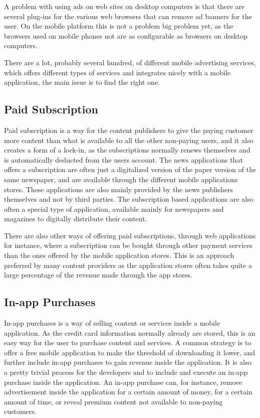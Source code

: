 A problem with using ads on web sites on desktop computers is that there are several plug-ins for the various web browsers that can remove ad banners for the user. On the mobile platform this is not a problem big problem yet, as the browsers used on mobile phones not are as configurable as browsers on desktop computers.

There are a lot, probably several hundred, of different mobile advertising services, which offers different types of services and integrates nicely with a mobile application, the main issue is to find the right one.

\subsection{Paid Subscription}
Paid subscription is a way for the content publishers to give the paying customer more content than what is available to all the other non-paying users, and it also creates a form of a lock-in, as the subscriptions normally renews themselves and is automatically deducted from the users account. The news applications that offers a subscription are often just a digitalized version of the paper version of the same newspaper, and are available through the different mobile applications stores. These applications are also mainly provided by the news publishers themselves and not by third parties. The subscription based applications are also often a special type of application, available mainly for newspapers and magazines to digitally distribute their content.

There are also other ways of offering paid subscriptions, through web applications for instance, where a subscription can be bought through other payment services than the ones offered by the mobile application stores. This is an approach preferred by many content providers as the application stores often takes quite a large percentage of the revenue made through the app stores.

\subsection{In-app Purchases}
In-app purchases is a way of selling content or services inside a mobile application. As the credit card information normally already are stored, this is an easy way for the user to purchase content and services. A common strategy is to offer a free mobile application to make the threshold of downloading it lower, and further include in-app purchases to gain revenue inside the application. It is also a pretty trivial process for the developers and to include and execute an in-app purchase inside the application. An in-app purchase can, for instance, remove advertisement inside the application for a certain amount of money, for a certain amount of time, or reveal premium content not available to non-paying customers.

